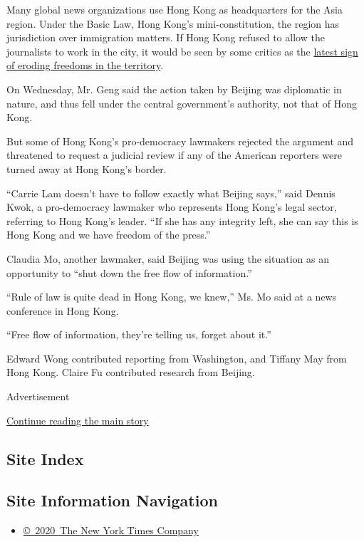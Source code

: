 Many global news organizations use Hong Kong as headquarters for the
Asia region. Under the Basic Law, Hong Kong's mini-constitution, the
region has jurisdiction over immigration matters. If Hong Kong refused
to allow the journalists to work in the city, it would be seen by some
critics as the
\href{https://www.nytimes3xbfgragh.onion/2018/10/08/world/asia/victor-mallet-hong-kong-financial-times.html}{latest
sign of eroding freedoms in the territory}.

On Wednesday, Mr. Geng said the action taken by Beijing was diplomatic
in nature, and thus fell under the central government's authority, not
that of Hong Kong.

But some of Hong Kong's pro-democracy lawmakers rejected the argument
and threatened to request a judicial review if any of the American
reporters were turned away at Hong Kong's border.

``Carrie Lam doesn't have to follow exactly what Beijing says,'' said
Dennis Kwok, a pro-democracy lawmaker who represents Hong Kong's legal
sector, referring to Hong Kong's leader. ``If she has any integrity
left, she can say this is Hong Kong and we have freedom of the press.''

Claudia Mo, another lawmaker, said Beijing was using the situation as an
opportunity to ``shut down the free flow of information.''

``Rule of law is quite dead in Hong Kong, we knew,'' Ms. Mo said at a
news conference in Hong Kong.

``Free flow of information, they're telling us, forget about it.''

Edward Wong contributed reporting from Washington, and Tiffany May from
Hong Kong. Claire Fu contributed research from Beijing.

Advertisement

\protect\hyperlink{after-bottom}{Continue reading the main story}

\hypertarget{site-index}{%
\subsection{Site Index}\label{site-index}}

\hypertarget{site-information-navigation}{%
\subsection{Site Information
Navigation}\label{site-information-navigation}}

\begin{itemize}
\tightlist
\item
  \href{https://help.nytimes3xbfgragh.onion/hc/en-us/articles/115014792127-Copyright-notice}{©~2020~The
  New York Times Company}
\end{itemize}

